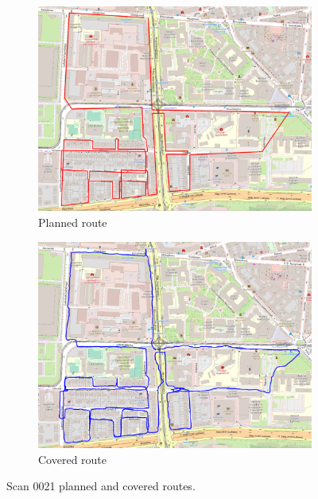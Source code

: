 \documentclass[a4paper,12pt]{article}
\begin{document}
\begin{enumerate}
\begin{figure}[H]
\begin{subfigure}{.90\textwidth}
			\includegraphics[width=1\linewidth]{route_p21}
			\caption{Planned route}
			\label{fig:a21}
		\end{subfigure}%
		\linebreak
		\begin{subfigure}{.90\textwidth}
			\centering
			\includegraphics[width=1\linewidth]{route_c21}
			\caption{Covered route}
			\label{fig:b21}
		\end{subfigure}
		\caption{Scan 0021 planned and covered routes.}
		\label{fig:fig21}
	\end{figure} 
\end{enumerate}
\end{document}
